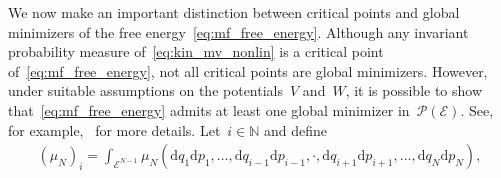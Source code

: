 \documentclass[onefignum,onetabnum]{siamart251216} %
\renewcommand{\d}{\mathrm{d}}
\newcommand{\mc}[1]{\mathcal{#1}}
\newcommand{\mescin}{\mu}
\newcommand{\projp}{\Pi}
\newcommand{\rg}[1]{\textcolor{rose}{\rm{[RG : #1]}}}
\newcommand{\gp}[1]{\textcolor{blue}{\rm{[GP : #1]}}}
\theoremstyle{plain}
\numberwithin{equation}{section}
\numberwithin{theorem}{section}
\newcounter{ucounter}
\newcommand{\uv}[1]{
  \stepcounter{ucounter}
  \textcolor{orange}{
      \\[.2cm]
    U, comment \arabic{ucounter}. #1
    \\[.2cm]
  }
}
\renewcommand{\uv}[1]{\textcolor{orange}{#1}}
\begin{document}
We now make an important distinction between critical points and global minimizers of the free energy~\eqref{eq:mf_free_energy}.
Although any invariant probability measure of~\eqref{eq:kin_mv_nonlin} is a critical point of~\eqref{eq:mf_free_energy}, not all critical points are global minimizers.
However, under suitable assumptions on the potentials~$V$ and~$W$,
it is possible to show that~\eqref{eq:mf_free_energy} admits at least one global minimizer in~$\mc{P}(\mc{E})$.
See, for example,~\cite{messer1982statistical, Bavaud_1991, delgadino2021diffusive} for more details.  %
Let~$i\in\mathbb{N}$ and define
\begin{align}
    \label{eq:marginals}
   (\mescin_N)_i = \int_{\mc{E}^{N-1}} \mescin_N(\d q_1\d p_1,\dots,\d q_{i-1}\d p_{i-1},\cdot,\d q_{i+1}\d p_{i+1},\dots,\d q_N\d p_N),
\end{align}
\end{document}
